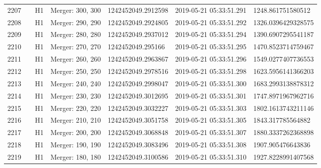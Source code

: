 \begin{longtable}{lllllll}
2207 &                                                    &       H1 &  Merger: 300, 300 &  1242452049.2912598 &  2019-05-21 05:33:51.291 &   1248.861751580512 \\
2208 &                                                    &       H1 &  Merger: 290, 290 &  1242452049.2924805 &  2019-05-21 05:33:51.292 &  1326.0396429328575 \\
2209 &                                                    &       H1 &  Merger: 280, 280 &  1242452049.2937012 &  2019-05-21 05:33:51.294 &  1390.6907295541187 \\
2210 &                                                    &       H1 &  Merger: 270, 270 &   1242452049.295166 &  2019-05-21 05:33:51.295 &  1470.8523714759467 \\
2211 &                                                    &       H1 &  Merger: 260, 260 &  1242452049.2963867 &  2019-05-21 05:33:51.296 &  1549.0277407736553 \\
2212 &                                                    &       H1 &  Merger: 250, 250 &  1242452049.2978516 &  2019-05-21 05:33:51.298 &  1623.5956141366203 \\
2213 &                                                    &       H1 &  Merger: 240, 240 &  1242452049.2998047 &  2019-05-21 05:33:51.300 &  1683.2993138878312 \\
2214 &                                                    &       H1 &  Merger: 230, 230 &  1242452049.3012695 &  2019-05-21 05:33:51.301 &  1747.8971967962716 \\
2215 &                                                    &       H1 &  Merger: 220, 220 &  1242452049.3032227 &  2019-05-21 05:33:51.303 &  1802.1613743211146 \\
2216 &                                                    &       H1 &  Merger: 210, 210 &  1242452049.3051758 &  2019-05-21 05:33:51.305 &   1843.317785564882 \\
2217 &                                                    &       H1 &  Merger: 200, 200 &  1242452049.3068848 &  2019-05-21 05:33:51.307 &  1880.3337262368898 \\
2218 &                                                    &       H1 &  Merger: 190, 190 &  1242452049.3083496 &  2019-05-21 05:33:51.308 &   1907.905476643836 \\
2219 &                                                    &       H1 &  Merger: 180, 180 &  1242452049.3100586 &  2019-05-21 05:33:51.310 &  1927.8228991407568 \\

\end{longtable}

